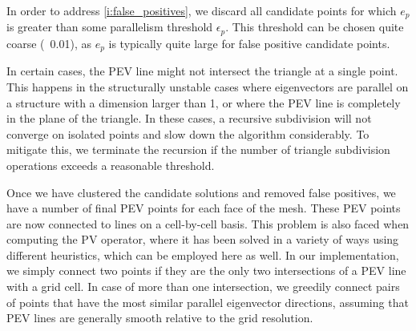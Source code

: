 %
In order to address \cref{i:false_positives}, we discard all candidate points
for which $e_p$ is greater than some parallelism threshold $\epsilon_p$.
%
This threshold can be chosen quite coarse (\eg~\num{0.01}), as $e_p$ is
typically quite large for false positive candidate points.
%


%
In certain cases, the \ac{PEV} line might not intersect the triangle at a single
point.
%
This happens in the structurally unstable cases where eigenvectors are parallel
on a structure with a dimension larger than \num{1}, or where the \ac{PEV} line
is completely in the plane of the triangle.
%
In these cases, a recursive subdivision will not converge on isolated points and
slow down the algorithm considerably.
%
To mitigate this, we terminate the recursion if the number of triangle
subdivision operations exceeds a reasonable threshold.
%

%
Once we have clustered the candidate solutions and removed false positives, we
have a number of final \ac{PEV} points for each face of the mesh.
%
These \ac{PEV} points are now connected to lines on a cell-by-cell basis.
%
This problem is also faced when computing the \ac{PV} operator, where it has
been solved in a variety of ways using different heuristics, which can be
employed here as well.
%
In our implementation, we simply connect two points if they are the only
two intersections of a \ac{PEV} line with a grid cell.
%
In case of more than one intersection, we greedily connect pairs of points
that have the most similar parallel eigenvector directions, assuming that
\ac{PEV} lines are generally smooth relative to the grid resolution.
%
